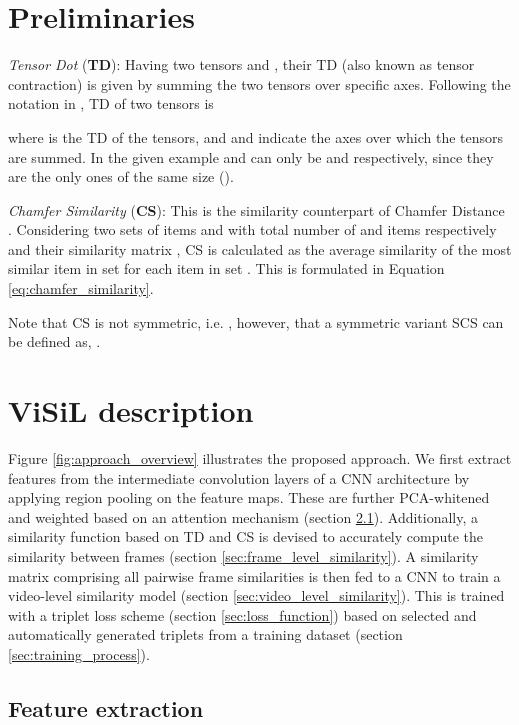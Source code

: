 \documentclass[10pt,twocolumn,letterpaper]{article}
\begin{document}
\section{Preliminaries}
\label{sec:preliminaries}


\textit{Tensor Dot} (\textbf{TD}): Having two tensors  and , their TD (also known as tensor contraction) is given by summing the two tensors over specific axes. Following the notation in \cite{yang2017}, TD of two tensors is

where  is the TD of the tensors, and  and  indicate the axes over which the tensors are summed. In the given example  and  can only be  and  respectively, since they are the only ones of the same size (). 

\textit{Chamfer Similarity} (\textbf{CS}): This is the similarity counterpart of Chamfer Distance \cite{barrow1977}. Considering two sets of items  and  with total number of  and  items respectively and their similarity matrix , CS is calculated as the average similarity of the most similar item in set  for each item in set . This is formulated in Equation \ref{eq:chamfer_similarity}.

Note that CS is not symmetric, i.e. , however, that a symmetric variant SCS can be defined as, .








\section{ViSiL description}

Figure \ref{fig:approach_overview} illustrates the proposed approach. We first extract features from the intermediate convolution layers of a CNN architecture by applying region pooling on the feature maps. These are further PCA-whitened and weighted based on an attention mechanism (section \ref{sec:feature_extraction}). Additionally, a similarity function based on TD and CS is devised to accurately compute the similarity between frames (section \ref{sec:frame_level_similarity}). A similarity matrix comprising all pairwise frame similarities is then fed to a CNN to train a video-level similarity model (section \ref{sec:video_level_similarity}). 
This is trained with a triplet loss scheme (section \ref{sec:loss_function}) based on selected and automatically generated triplets from a training dataset (section \ref{sec:training_process}). 

\subsection{Feature extraction}
\label{sec:feature_extraction}
\end{document}
